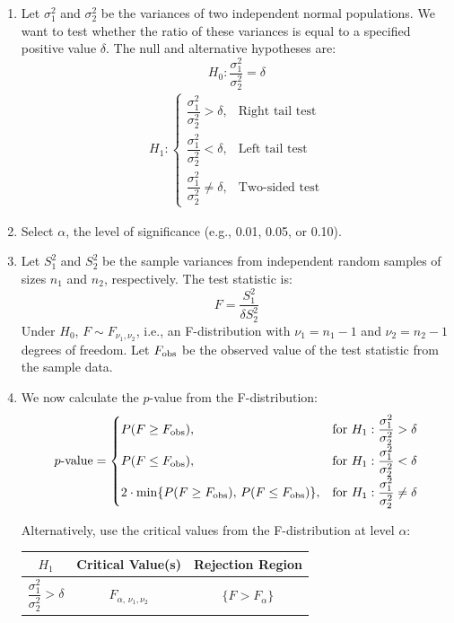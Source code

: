 \documentclass[twoside]{book}
\begin{document}
\begin{enumerate}
	\item Let \(\sigma_1^2\) and \(\sigma_2^2\) be the variances of two independent normal populations. We want to test whether the ratio of these variances is equal to a specified positive value \(\delta\). The null and alternative hypotheses are:
	\[
	H_0: \frac{\sigma_1^2}{\sigma_2^2} = \delta
	\]
	\begin{align*}
	H_1: \begin{cases}
	\dfrac{\sigma_1^2}{\sigma_2^2} > \delta, & \text{Right tail test}\\[6pt]
	\dfrac{\sigma_1^2}{\sigma_2^2} < \delta, & \text{Left tail test}\\[6pt]
	\dfrac{\sigma_1^2}{\sigma_2^2} \neq \delta, & \text{Two-sided test}
	\end{cases}
	\end{align*}

	\item Select \(\alpha\), the level of significance (e.g., 0.01, 0.05, or 0.10).

	\item Let \(S_1^2\) and \(S_2^2\) be the sample variances from independent random samples of sizes \(n_1\) and \(n_2\), respectively. The test statistic is:
	\[
	F = \dfrac{S_1^2}{\delta S_2^2}
	\]
	Under \(H_0\), \(F \sim F_{\nu_1,\nu_2}\), i.e., an F-distribution with \(\nu_1 = n_1 - 1\) and \(\nu_2 = n_2 - 1\) degrees of freedom. Let \(F_{\rm obs}\) be the observed value of the test statistic from the sample data.

	\item We now calculate the \(p\)-value from the F-distribution:
	\[
	p\text{-value} =
	\begin{cases}
	P(F \ge F_{\rm obs}), & \text{for } H_1: \dfrac{\sigma_1^2}{\sigma_2^2} > \delta \\[6pt]
	P(F \le F_{\rm obs}), & \text{for } H_1: \dfrac{\sigma_1^2}{\sigma_2^2} < \delta \\[6pt]
	2 \cdot \min\{P(F \ge F_{\rm obs}),\, P(F \le F_{\rm obs})\}, & \text{for } H_1: \dfrac{\sigma_1^2}{\sigma_2^2} \neq \delta
	\end{cases}
	\]

	Alternatively, use the critical values from the F-distribution at level \(\alpha\):

	\begin{table}[H]
		\centering
		\begin{tabular}{@{}c|c|c@{}}
			\toprule
			\textbf{$H_1$} & \textbf{Critical Value(s)} & \textbf{Rejection Region} \\
			\midrule
			\(\dfrac{\sigma_1^2}{\sigma_2^2} > \delta\) &
			\(F_{\alpha,\,\nu_1,\nu_2}\) &
			\(\{F > F_{\alpha}\}\) \\[6pt]


\end{tabular}
\end{table}
\end{enumerate}
\end{document}
